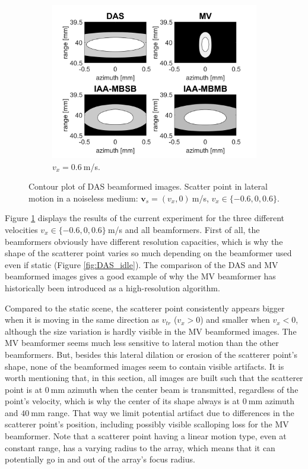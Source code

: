 \begin{figure}[ht]
\begin{subfigure}[t]{0.48\linewidth}
        \includegraphics[width=\linewidth]{./images/results/2.1/motion_0_06.png}
        \caption{$v_x = 0.6~$m/s.}
    \end{subfigure}
	\caption{Contour plot of DAS beamformed images. Scatter point in lateral motion in a noiseless medium: $\boldsymbol{v}_s = (v_x, 0)~$m/s, $v_x \in \{-0.6, 0, 0.6\}$.}
	\label{fig:illustration_all}
\end{figure}

Figure \ref{fig:illustration_all} displays the results of the current experiment for the three different velocities $v_x \in \{-0.6, 0, 0.6\}~$m/s and all beamformers.
First of all, the beamformers obviously have different resolution capacities, which is why the shape of the scatterer point varies so much depending on the beamformer used even if static (Figure \ref{fig:DAS_idle}). The comparison of the DAS and MV beamformed images gives a good example of why the MV beamformer has historically been introduced as a high-resolution algorithm.

Compared to the static scene, the scatterer point consistently appears bigger when it is moving in the same direction as $v_{tr}$ ($v_x > 0$) and smaller when $v_x < 0$, although the size variation is hardly visible in the MV beamformed images. The MV beamformer seems much less sensitive to lateral motion than the other beamformers.
But, besides this lateral dilation or erosion of the scatterer point's shape, none of the beamformed images seem to contain visible artifacts.
It is worth mentioning that, in this section, all images are built such that the scatterer point is at $0~$mm azimuth when the center beam is transmitted, regardless of the point's velocity, which is why the center of its shape always is at $0~$mm azimuth and $40~$mm range.
That way we limit potential artifact due to differences in the scatterer point's position, including possibly visible scalloping loss for the MV beamformer.
Note that a scatterer point having a linear motion type, even at constant range, has a varying radius to the array, which means that it can potentially go in and out of the array's focus radius.

